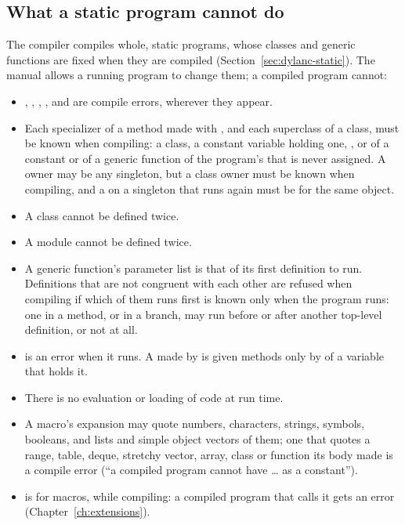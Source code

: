\subsection{What a static program cannot do}

The compiler compiles whole, static programs, whose classes and generic
functions are fixed when they are compiled
(Section~\ref{sec:dylanc-static}). The manual allows a running program
to change them; a compiled program cannot:

\begin{itemize}
\item {}, , ,
  ,  and
   are compile errors,
  wherever they appear.
\item Each specializer of a method made with , and
  each superclass of a class, must be known when compiling: a class, a
  constant variable holding one, , or
   of a constant or of a
  generic function of the program's that is never assigned. A
   owner may be any singleton, but a class owner must
  be known when compiling, and a  on a singleton that
  runs again must be for the same object.
\item A class cannot be defined twice.
\item A module cannot be defined twice.
\item A generic function's parameter list is that of its first
  definition to run. Definitions that are not congruent with each other
  are refused when compiling if which of them runs first is known only
  when the program runs: one in a method, or in a branch, may run
  before or after another top-level definition, or not at all.
\item {} is an error when it runs. A
   made by  is given methods only by
   of a variable that holds it.
\item There is no evaluation or loading of code at run time.
\item A macro's expansion may quote numbers, characters, strings,
  symbols, booleans, and lists and simple object vectors of them; one
  that quotes a range, table, deque, stretchy vector, array, class or
  function its body made is a compile error (``a compiled program cannot
  have \ldots{} as a constant'').
\item {} is for macros, while compiling: a compiled program
  that calls it gets an error (Chapter~\ref{ch:extensions}).
\end{itemize}

